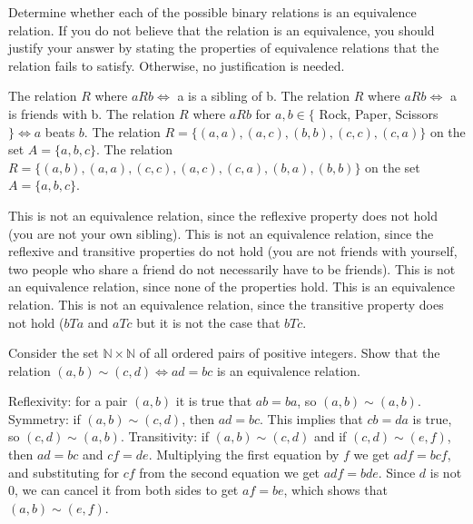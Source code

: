 \documentclass[solution, letterpaper]{cs20}
\begin{document}


Determine whether each of the possible binary relations is an equivalence relation. If you do not believe that the relation is an equivalence, you should justify your answer by stating the properties of equivalence relations that the relation fails to satisfy. Otherwise, no justification is needed.

\subproblem The relation $R$ where $aRb \iff$ a is a sibling of b.
\subproblem The relation $R$ where $aRb \iff$ a is friends with b.
\subproblem The relation $R$ where $aRb$ for $a, b \in \{$ Rock, Paper, Scissors $\} \iff a$ beats $b$.
\subproblem The relation $R = \{(a, a), (a, c), (b, b), (c, c), (c, a) \}$ on the set $A = \{a, b, c\}$.
\subproblem The relation $R = \{(a, b), (a, a), (c, c), (a, c), (c, a), (b, a), (b, b) \}$ on the set $A = \{a, b, c\}$.

\begin{solution}

\subsolution This is not an equivalence relation, since the reflexive property does not hold (you are not your own sibling).
\subsolution This is not an equivalence relation, since the reflexive and transitive properties do not hold (you are not friends with yourself, two people who share a friend do not necessarily have to be friends).
\subsolution This is not an equivalence relation, since none of the properties hold.
\subsolution This is an equivalence relation.
\subsolution This is not an equivalence relation, since the transitive property does not hold ($bTa$ and $aTc$ but it is not the case that $bTc$.

\end{solution}


Consider the set $\mathbb{N} \times \mathbb{N}$ of all ordered pairs of positive integers. Show that the relation $(a, b) \sim (c,d) \iff ad = bc$ is an equivalence relation.

\begin{solution}

\subsolution Reflexivity: for a pair $(a, b)$ it is true that $ab = ba$, so $(a, b) \sim (a, b)$.
\subsolution Symmetry: if $(a, b) \sim (c, d)$, then $ad = bc$. This implies that $cb = da$ is true, so $(c, d) \sim (a, b)$.
\subsolution Transitivity: if $(a, b) \sim (c, d)$ and if $(c, d) \sim (e, f)$, then $ad = bc$ and $cf = de$. Multiplying the first equation by $f$ we get $adf = bcf$, and substituting for $cf$ from the second equation we get $adf = bde$. Since $d$ is not 0, we can cancel it from both sides to get $af = be$, which shows that $(a, b) \sim (e, f)$.
\end{solution}
\end{document}
